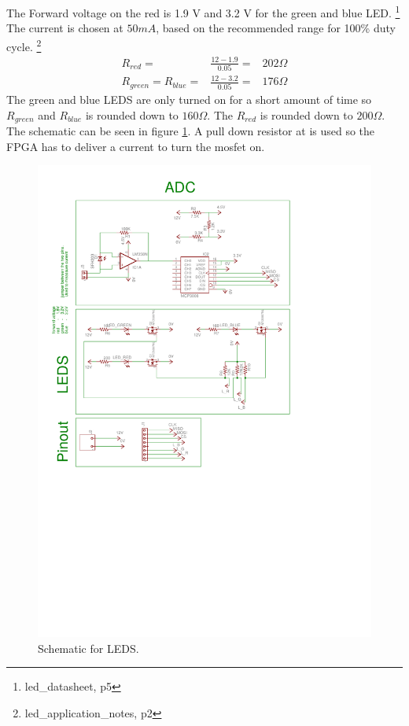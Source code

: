 The Forward voltage on the red is 1.9 V and 3.2 V for the green and blue LED.
\footnote{led\_datasheet, p5}
The current is chosen at $50 mA$, based on the recommended range for 100\% duty cycle.
\footnote{led\_application\_notes, p2}
\begin{eqnarray}
 R_{red} =& \frac{12-1.9}{0.05} =& 202 \Omega\\
 R_{green} = R_{blue} =& \frac{12-3.2}{0.05} =& 176 \Omega
\end{eqnarray}
The green and blue LEDS are only turned on for a short amount of time so $R_{green}$ and $R_{blue}$ is rounded down to $160 \Omega$.
The $R_{red}$ is rounded down to $200\Omega$.
The schematic can be seen in figure \ref{fig:sch_led}.
A pull down resistor at is used so the FPGA has to deliver a current to turn the mosfet on.

\begin{figure}
\centering
 \includegraphics[scale=0.9,trim={2.4cm 14cm 5.1cm 9cm},clip]{img/adc_schematic.pdf}
  \caption{Schematic for LEDS.}
  \label{fig:sch_led}
\end{figure}

